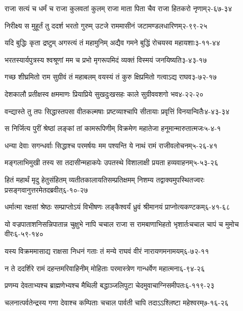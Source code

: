 \annotwolineshloka
{राजा सत्यं च धर्मं च  राजा कुलवतां कुलम्}
{राजा माता पिता चैव राजा हितकरो नृणाम्}{२-६७-३४}

\annotwolineshloka
{निरीक्ष्य स मुहूर्तं तु ददर्श भरतो गुरुम्}
{उटजे राममासीनं जटामण्डलधारिणम्}{२-९९-२५}

\annotwolineshloka
{यदि बुद्धिः कृता द्रष्टुम् अगस्त्यं तं महामुनिम्}
{अद्यैव गमने बुद्धिं रोचयस्व महायशाः}{३-११-४४}

\annotwolineshloka
{भरतस्यार्यपुत्रस्य श्वश्रूणां मम च प्रभो}
{मृगरूपमिदं व्यक्तं विस्मयं जनयिष्यति}{३-४३-१७}

\annotwolineshloka
{गच्छ शीघ्रमितो राम सुग्रीवं तं महाबलम्}
{वयस्यं तं कुरु क्षिप्रमितो गत्वाऽद्य राघव}{३-७२-१७}

\annotwolineshloka
{देशकालौ प्रतीक्षस्व क्षममाणः प्रियाप्रिये}
{सुखदुःखसहः काले  सुग्रीववशगो भव}{४-२२-२०}

\annotwolineshloka
{वन्द्यास्ते तु तपः सिद्धास्तपसा वीतकल्मषाः}
{प्रष्टव्याश्चापि सीतायाः प्रवृत्तिं विनयान्वितैः}{४-४३-३४}

\annotwolineshloka
{स निर्जित्य पुरीं श्रेष्ठां लङ्कां तां कामरूपिणीम्}
{विक्रमेण महातेजा हनूमान्मारुतात्मजः}{५-४-१}

\annotwolineshloka
{धन्या देवाः सगन्धर्वाः सिद्धाश्च परमर्षयः}
{मम पश्यन्ति ये नाथं रामं राजीवलोचनम्}{५-२६-४१}

\annotwolineshloka
{मङ्गलाभिमुखी तस्य सा तदासीन्महाकपेः}
{उपतस्थे विशालाक्षी प्रयता हव्यवाहनम्}{५-५३-२६}

\annofourlineindentedshloka
{हितं महार्थं मृदु हेतुसंहितम्}
{व्यतीतकालायतिसम्प्रतिक्षमम्}
{निशम्य तद्वाक्यमुपस्थितज्वरः}
{प्रसङ्गवानुत्तरमेतदब्रवीत्}{६-१०-२७}

\annotwolineshloka
{धर्मात्मा रक्षसां श्रेष्ठः सम्प्राप्तोऽयं विभीषणः}
{लङ्कैश्वर्यं ध्रुवं श्रीमानयं प्राप्नोत्यकण्टकम्}{६-४१-६८}

\annofourlineindentedshloka
{यो वज्रपाताशनिसन्निपातान्}{न चुक्षुभे नापि चचाल राजा}
{स रामबाणाभिहतो भृशार्तः}{चचाल चापं च मुमोच वीरः}{६-५९-१४०}

\annotwolineshloka
{यस्य विक्रममासाद्य राक्षसा निधनं गताः}
{तं मन्ये राघवं वीरं नारायणमनामयम्}{६-७२-११}

\annotwolineshloka
{न ते ददर्शिरे रामं दहन्तमरिवाहिनीम्}
{मोहिताः परमास्त्रेण गान्धर्वेण महात्मना}{६-९४-२६}

\annotwolineshloka
{प्रणम्य देवताभ्यश्च ब्राह्मणेभ्यश्च मैथिली}
{बद्धाञ्जलिपुटा चेदमुवाचाग्निसमीपतः}{६-११९-२३}

\annotwolineshloka
{चलनात्पर्वतेन्द्रस्य गणा देवाश्च कम्पिताः}
{चचाल पार्वती चापि तदाऽऽश्लिष्टा महेश्वरम्}{७-१६-२६}

